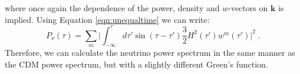 \documentclass{aastex}
\begin{document}
where once again the dependence of the power, density and
$w$-vectors on $\mathbf{k}$ is implied.
Using Equation \eqref{eqn:unequaltime} we can write:
\begin{equation}\label{eqn:densitypowernu2}
  P_\nu(\tau) = \sum_m \bigg | \int_{-\infty}^\tau d \tau' \sin
   (\tau
  - \tau') \frac{3}{2} H^2(\tau') w^m( \tau' ) \bigg |^2\;.
\end{equation}
Therefore, we can calculate the neutrino power spectrum in
the same manner as the CDM power spectrum, but with a slightly
different Green's function.


\end{document}
